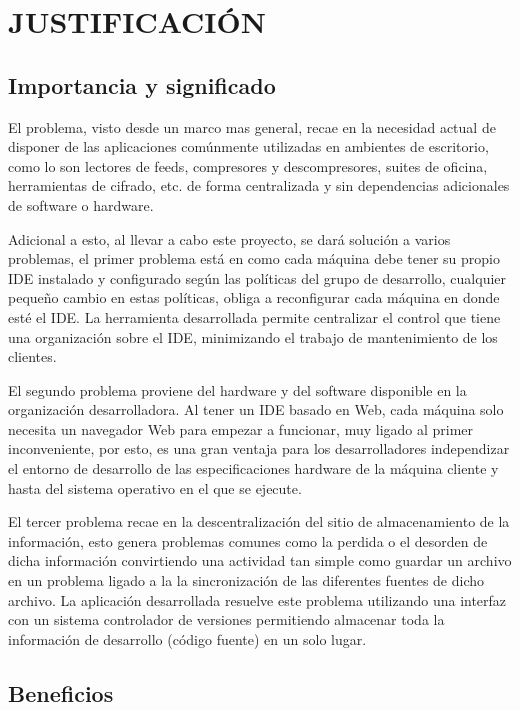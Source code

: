 \section{JUSTIFICACIÓN}


\subsection{Importancia y significado}

El problema, visto desde un marco mas general, recae en la necesidad actual de disponer de las aplicaciones comúnmente utilizadas en ambientes de escritorio, como lo son lectores de feeds, compresores y descompresores, suites de oficina, herramientas de cifrado, etc. de forma centralizada y sin dependencias adicionales de software o hardware.

Adicional a esto, al llevar a cabo este proyecto, se dará solución a varios problemas, el primer problema está en como cada máquina debe tener su propio IDE instalado y configurado según las políticas del grupo de desarrollo, cualquier pequeño cambio en estas políticas, obliga a reconfigurar cada máquina en donde esté el IDE. La herramienta desarrollada permite centralizar el control que tiene una organización sobre el IDE, minimizando el trabajo de mantenimiento de los clientes.

El segundo problema proviene del hardware y del software disponible en la organización desarrolladora. Al tener un IDE basado en Web, cada máquina solo necesita un navegador Web para empezar a funcionar, muy ligado al primer inconveniente, por esto, es una gran ventaja para los desarrolladores independizar el entorno de desarrollo de las especificaciones hardware de la máquina cliente y hasta del sistema operativo en el que se ejecute.

El tercer problema recae en la descentralización del sitio de almacenamiento de la información, esto genera problemas comunes como la perdida o el desorden de dicha información convirtiendo una actividad tan simple como guardar un archivo en un problema ligado a la la sincronización de las diferentes fuentes de dicho archivo. La aplicación desarrollada resuelve este problema utilizando una interfaz con un sistema controlador de versiones permitiendo almacenar toda la información de desarrollo (código fuente) en un solo lugar.


\subsection{Beneficios}

